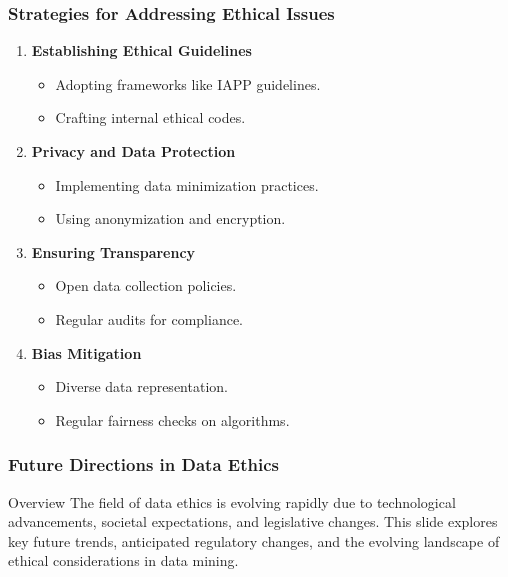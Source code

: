 \documentclass[aspectratio=169]{beamer}
\begin{document}
\begin{frame}[fragile]
    \frametitle{Strategies for Addressing Ethical Issues}
    \begin{enumerate}
        \item \textbf{Establishing Ethical Guidelines}
            \begin{itemize}
                \item Adopting frameworks like IAPP guidelines.
                \item Crafting internal ethical codes.
            \end{itemize}
        \item \textbf{Privacy and Data Protection}
            \begin{itemize}
                \item Implementing data minimization practices.
                \item Using anonymization and encryption.
            \end{itemize}
        \item \textbf{Ensuring Transparency}
            \begin{itemize}
                \item Open data collection policies.
                \item Regular audits for compliance.
            \end{itemize}
        \item \textbf{Bias Mitigation}
            \begin{itemize}
                \item Diverse data representation.
                \item Regular fairness checks on algorithms.
            \end{itemize}
    \end{enumerate}
\end{frame}

\begin{frame}[fragile]
    \frametitle{Future Directions in Data Ethics}
    \begin{block}{Overview}
        The field of data ethics is evolving rapidly due to technological advancements, societal expectations, and legislative changes. This slide explores key future trends, anticipated regulatory changes, and the evolving landscape of ethical considerations in data mining.
    \end{block}
\end{frame}
\end{document}
